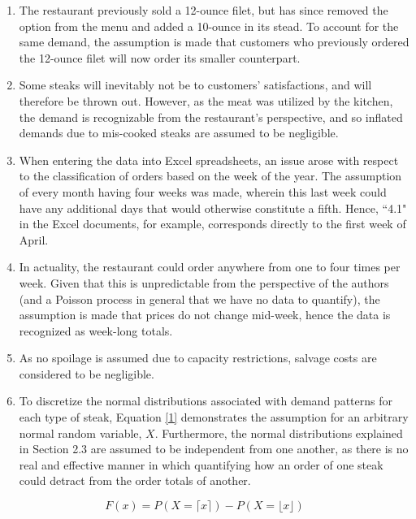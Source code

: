 \documentclass[12pt,a4paper]{article}
\begin{document}
\begin{enumerate}
\item The restaurant previously sold a 12-ounce filet, but has since removed the option from the menu and added a 10-ounce in its stead. To account for the same demand, the assumption is made that customers who previously ordered the 12-ounce filet will now order its smaller counterpart.

\item Some steaks will inevitably not be to customers' satisfactions, and will therefore be thrown out. However, as the meat was utilized by the kitchen, the demand is recognizable from the restaurant's perspective, and so inflated demands due to mis-cooked steaks are assumed to be negligible.

\item When entering the data into Excel spreadsheets, an issue arose with respect to the classification of orders based on the week of the year. The assumption of every month having four weeks was made, wherein this last week could have any additional days that would otherwise constitute a fifth. Hence, ``4.1" in the Excel documents, for example, corresponds directly to the first week of April.

\item In actuality, the restaurant could order anywhere from one to four times per week. Given that this is unpredictable from the perspective of the authors (and a Poisson process in general that we have no data to quantify), the assumption is made that prices do not change mid-week, hence the data is recognized as week-long totals.

\item As no spoilage is assumed due to capacity restrictions, salvage costs are considered to be negligible.

\item To discretize the normal distributions associated with demand patterns for each type of steak, Equation \ref{1} demonstrates the assumption for an arbitrary normal random variable, $X$. Furthermore, the normal distributions explained in Section 2.3 are assumed to be independent from one another, as there is no real and effective manner in which quantifying how an order of one steak could detract from the order totals of another.
\end{enumerate}

\begin{equation} \label{1}
F(x) = P(X = \lceil x \rceil) - P(X = \lfloor x \rfloor)
\end{equation}
\end{document}
